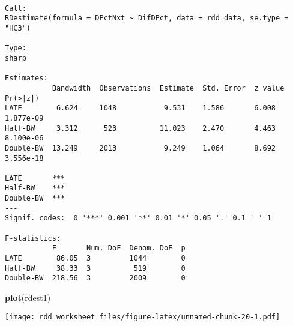 \documentclass[
  12pt,
  leqno]{article}
\newenvironment{Shaded}{\begin{snugshade}}{\end{snugshade}}
\newcommand{\AttributeTok}[1]{\textcolor[rgb]{0.13,0.29,0.53}{#1}}
\newcommand{\FunctionTok}[1]{\textcolor[rgb]{0.13,0.29,0.53}{\textbf{#1}}}
\newcommand{\NormalTok}[1]{#1}
\newcommand{\OtherTok}[1]{\textcolor[rgb]{0.56,0.35,0.01}{#1}}
\newcommand{\SpecialCharTok}[1]{\textcolor[rgb]{0.81,0.36,0.00}{\textbf{#1}}}
\begin{document}
\begin{verbatim}

Call:
RDestimate(formula = DPctNxt ~ DifDPct, data = rdd_data, se.type = "HC3")

Type:
sharp 

Estimates:
           Bandwidth  Observations  Estimate  Std. Error  z value  Pr(>|z|) 
LATE        6.624     1048           9.531    1.586       6.008    1.877e-09
Half-BW     3.312      523          11.023    2.470       4.463    8.100e-06
Double-BW  13.249     2013           9.249    1.064       8.692    3.556e-18
              
LATE       ***
Half-BW    ***
Double-BW  ***
---
Signif. codes:  0 '***' 0.001 '**' 0.01 '*' 0.05 '.' 0.1 ' ' 1

F-statistics:
           F       Num. DoF  Denom. DoF  p
LATE        86.05  3         1044        0
Half-BW     38.33  3          519        0
Double-BW  218.56  3         2009        0
\end{verbatim}

\begin{Shaded}
\begin{Highlighting}[]
\FunctionTok{plot}\NormalTok{(rdest1)}
\end{Highlighting}
\end{Shaded}

\texttt{[image: rdd\_worksheet\_files/figure-latex/unnamed-chunk-20-1.pdf]}
\normalsize

\scriptsize

\begin{Shaded}
\end{Shaded}
\end{document}
